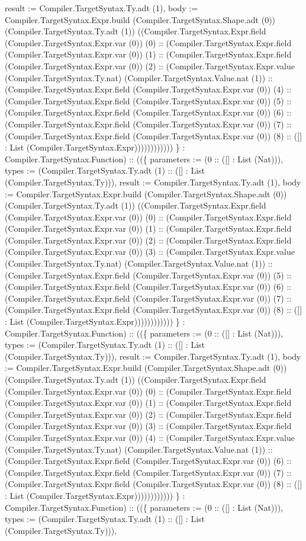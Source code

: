 \documentclass[11pt]{article}
\begin{document}
result := Compiler.TargetSyntax.Ty.adt (1), body := Compiler.TargetSyntax.Expr.build (Compiler.TargetSyntax.Shape.adt (0)) (Compiler.TargetSyntax.Ty.adt (1)) ((Compiler.TargetSyntax.Expr.field (Compiler.TargetSyntax.Expr.var (0)) (0) :: (Compiler.TargetSyntax.Expr.field (Compiler.TargetSyntax.Expr.var (0)) (1) :: (Compiler.TargetSyntax.Expr.field (Compiler.TargetSyntax.Expr.var (0)) (2) :: (Compiler.TargetSyntax.Expr.value (Compiler.TargetSyntax.Ty.nat) (Compiler.TargetSyntax.Value.nat (1)) :: (Compiler.TargetSyntax.Expr.field (Compiler.TargetSyntax.Expr.var (0)) (4) :: (Compiler.TargetSyntax.Expr.field (Compiler.TargetSyntax.Expr.var (0)) (5) :: (Compiler.TargetSyntax.Expr.field (Compiler.TargetSyntax.Expr.var (0)) (6) :: (Compiler.TargetSyntax.Expr.field (Compiler.TargetSyntax.Expr.var (0)) (7) :: (Compiler.TargetSyntax.Expr.field (Compiler.TargetSyntax.Expr.var (0)) (8) :: ([] : List (Compiler.TargetSyntax.Expr)))))))))))) \} : Compiler.TargetSyntax.Function) :: ((\{ parameters := (0 :: ([] : List (Nat))), types := (Compiler.TargetSyntax.Ty.adt (1) :: ([] : List (Compiler.TargetSyntax.Ty))), result := Compiler.TargetSyntax.Ty.adt (1), body := Compiler.TargetSyntax.Expr.build (Compiler.TargetSyntax.Shape.adt (0)) (Compiler.TargetSyntax.Ty.adt (1)) ((Compiler.TargetSyntax.Expr.field (Compiler.TargetSyntax.Expr.var (0)) (0) :: (Compiler.TargetSyntax.Expr.field (Compiler.TargetSyntax.Expr.var (0)) (1) :: (Compiler.TargetSyntax.Expr.field (Compiler.TargetSyntax.Expr.var (0)) (2) :: (Compiler.TargetSyntax.Expr.field (Compiler.TargetSyntax.Expr.var (0)) (3) :: (Compiler.TargetSyntax.Expr.value (Compiler.TargetSyntax.Ty.nat) (Compiler.TargetSyntax.Value.nat (1)) :: (Compiler.TargetSyntax.Expr.field (Compiler.TargetSyntax.Expr.var (0)) (5) :: (Compiler.TargetSyntax.Expr.field (Compiler.TargetSyntax.Expr.var (0)) (6) :: (Compiler.TargetSyntax.Expr.field (Compiler.TargetSyntax.Expr.var (0)) (7) :: (Compiler.TargetSyntax.Expr.field (Compiler.TargetSyntax.Expr.var (0)) (8) :: ([] : List (Compiler.TargetSyntax.Expr)))))))))))) \} : Compiler.TargetSyntax.Function) :: ((\{ parameters := (0 :: ([] : List (Nat))), types := (Compiler.TargetSyntax.Ty.adt (1) :: ([] : List (Compiler.TargetSyntax.Ty))), result := Compiler.TargetSyntax.Ty.adt (1), body := Compiler.TargetSyntax.Expr.build (Compiler.TargetSyntax.Shape.adt (0)) (Compiler.TargetSyntax.Ty.adt (1)) ((Compiler.TargetSyntax.Expr.field (Compiler.TargetSyntax.Expr.var (0)) (0) :: (Compiler.TargetSyntax.Expr.field (Compiler.TargetSyntax.Expr.var (0)) (1) :: (Compiler.TargetSyntax.Expr.field (Compiler.TargetSyntax.Expr.var (0)) (2) :: (Compiler.TargetSyntax.Expr.field (Compiler.TargetSyntax.Expr.var (0)) (3) :: (Compiler.TargetSyntax.Expr.field (Compiler.TargetSyntax.Expr.var (0)) (4) :: (Compiler.TargetSyntax.Expr.value (Compiler.TargetSyntax.Ty.nat) (Compiler.TargetSyntax.Value.nat (1)) :: (Compiler.TargetSyntax.Expr.field (Compiler.TargetSyntax.Expr.var (0)) (6) :: (Compiler.TargetSyntax.Expr.field (Compiler.TargetSyntax.Expr.var (0)) (7) :: (Compiler.TargetSyntax.Expr.field (Compiler.TargetSyntax.Expr.var (0)) (8) :: ([] : List (Compiler.TargetSyntax.Expr)))))))))))) \} : Compiler.TargetSyntax.Function) :: ((\{ parameters := (0 :: ([] : List (Nat))), types := (Compiler.TargetSyntax.Ty.adt (1) :: ([] : List (Compiler.TargetSyntax.Ty))), 
\end{document}
